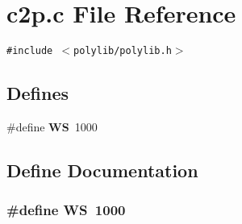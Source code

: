 \section{c2p.c File Reference}
\label{c2p_8c}
{\tt \#include $<$polylib/polylib.h$>$}\par
\subsection*{Defines}
\begin{CompactItemize}
\item 
\#define {\bf WS}\ 1000
\end{CompactItemize}


\subsection{Define Documentation}
\subsubsection{\setlength{\rightskip}{0pt plus 5cm}\#define WS\ 1000}\label{c2p_8c_a0}


